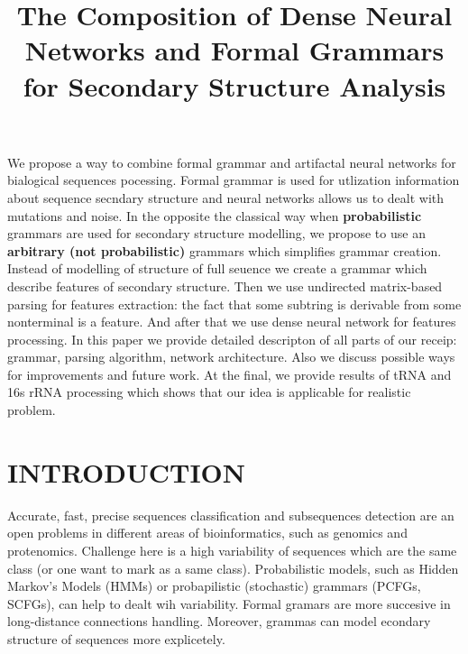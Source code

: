 \documentclass[a4paper,twoside]{article}
\begin{document}
\title{The Composition of Dense Neural Networks and Formal Grammars for Secondary Structure Analysis}

\author{
}


\abstract
{
We propose a way to combine formal grammar and artifactal neural networks for bialogical sequences pocessing.
Formal grammar is used for utlization information about sequence secndary structure and neural networks allows us to dealt with mutations and noise.
In the opposite the classical way when \textbf{probabilistic} grammars are used for secondary structure modelling, we propose to use an \textbf{arbitrary (not probabilistic)} grammars which simplifies grammar creation.
Instead of modelling of structure of full seuence we create a grammar which describe features of secondary structure.
Then we use undirected matrix-based parsing for features extraction: the fact that some subtring is derivable from some nonterminal is a feature. 
And after that we use dense neural network for features processing.
In this paper we provide detailed descripton of all parts of our receip: grammar, parsing algorithm, network architecture.
Also we discuss possible ways for improvements and future work.
At the final, we provide results of tRNA and 16s rRNA processing which shows that our idea is applicable for realistic problem.
}

\onecolumn \maketitle \normalsize \vfill

\section{\uppercase{Introduction}}
\label{sec:introduction}

\noindent Accurate, fast, precise sequences classification and subsequences detection are an open problems in different areas of bioinformatics, such as genomics and protenomics. 
Challenge here is a high variability of sequences which are the same class (or one want to mark as a same class).
Probabilistic models, such as Hidden Markov's Models (HMMs) or probapilistic (stochastic) grammars (PCFGs, SCFGs), can help to dealt wih variability.
Formal gramars are more succesive in long-distance connections handling.
Moreover, grammas can model econdary structure of sequences more explicetely.
\end{document}

